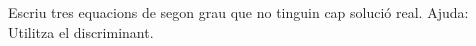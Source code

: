 \begin{activitats}
\begin{mylist}

\exer  Escriu tres equacions de segon grau que no tinguin cap solució real. Ajuda: Utilitza el discriminant.

\end{mylist}
\end{activitats}
